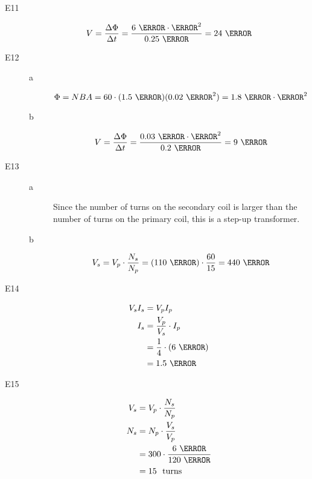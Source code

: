 \documentclass{exam}
\begin{document}
\begin{description}

\item[E11]
\[
  V = \frac{\Delta \Phi}{\Delta t} = \frac{6 \ \tesla \cdot \meter^2}{0.25 \ \second} = 24 \ \volt
\]

\item[E12]
\begin{description}
\item[a]
\[
  \Phi = NBA = 60 \cdot (1.5 \ \tesla)(0.02 \ \meter^2) = 1.8 \ \tesla \cdot \meter^2
\]

\item[b]
\[
  V = \frac{\Delta \Phi}{\Delta t} = \frac{0.03 \ \tesla \cdot \meter^2}{0.2 \ \second} = 9 \ \volt
\]

\end{description}

\item[E13]
\begin{description}
\item[a]
Since the number of turns on the secondary coil is larger than the number of turns on the primary coil, this is a
step-up transformer.

\item[b]
\[
  V_s = V_p \cdot \frac{N_s}{N_p} = (110 \ \volt) \cdot \frac{60}{15} = 440 \ \volt
\]

\end{description}

\item[E14]
\begin{align*}
  V_s I_s &= V_p I_p \\
  I_s &= \frac{V_p}{V_s} \cdot I_p \\
      &= \frac{1}{4} \cdot (6 \ \ampere) \\
      &= 1.5 \ \ampere \\
\end{align*}



\item[E15]
\begin{align*}
  V_s &= V_p \cdot \frac{N_s}{N_p} \\
  N_s &= N_p \cdot \frac{V_s}{V_p} \\
      &= 300 \cdot \frac{6 \ \volt}{120 \ \volt} \\
      &= 15 \ \text{ turns} \\
\end{align*}

\end{description}
\end{document}
